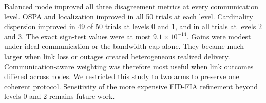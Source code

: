 Balanced mode improved all three disagreement metrics at every communication level. OSPA and localization improved in all 50 trials at each level. Cardinality dispersion improved in 49 of 50 trials at levels $0$ and $1$, and in all trials at levels $2$ and $3$. The exact sign-test values were at most $9.1\times10^{-14}$. Gains were modest under ideal communication or the bandwidth cap alone. They became much larger when link loss or outages created heterogeneous realized delivery. Communication-aware weighting was therefore most useful when link outcomes differed across nodes. We restricted this study to two arms to preserve one coherent protocol. Sensitivity of the more expensive FID-FIA refinement beyond levels $0$ and $2$ remains future work.
